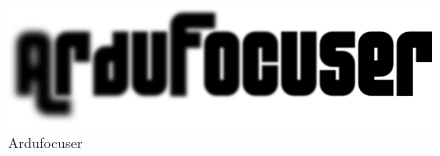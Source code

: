 \begin{center}
{\LARGE\bfseries\titulo}\\
\end{center}
\begin{center}
\autor\
\end{center}

\begin{figure}[h]
\centering
\includegraphics[width=0.7\linewidth]{../images/simple}
\caption[Ardufocuser]{Ardufocuser}
\label{fig:logo}
\end{figure}

\newpage


